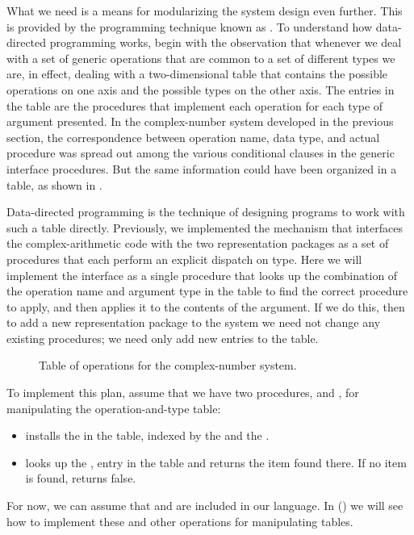 What we need is a means for modularizing the system design even further.
This is provided by the programming technique known as .
To understand how data-directed programming works, begin with the observation that whenever we deal with a set of generic operations that are common to a set of different types we are, in effect, dealing with a two-dimensional table that contains the possible operations on one axis and the possible types on the other axis.
The entries in the table are the procedures that implement each operation for each type of argument presented.
In the complex-number system developed in the previous section, the correspondence between operation name, data type, and actual procedure was spread out among the various conditional clauses in the generic interface procedures.
But the same information could have been organized in a table, as shown in .

Data-directed programming is the technique of designing programs to work with such a table directly.
Previously, we implemented the mechanism that interfaces the complex-arithmetic code with the two representation packages as a set of procedures that each perform an explicit dispatch on type.
Here we will implement the interface as a single procedure that looks up the combination of the operation name and argument type in the table to find the correct procedure to apply, and then applies it to the contents of the argument.
If we do this, then to add a new representation package to the system we need not change any existing procedures;
we need only add new entries to the table.

\begin{figure}[tb]
	\centering
	
	\caption{
		Table of operations for the complex-number system.
	}
	\label{Figure 2.22}
\end{figure}

To implement this plan, assume that we have two procedures,  and
, for manipulating the operation-and-type table:
\begin{itemize}

	\item
		 installs the  in the table, indexed by the  and the .

	\item
		 looks up the ,  entry in the table and returns the item found there.
		If no item is found,  returns false.

\end{itemize}
For now, we can assume that  and  are included in our language.
In  () we will see how to implement these and other operations for manipulating tables.

